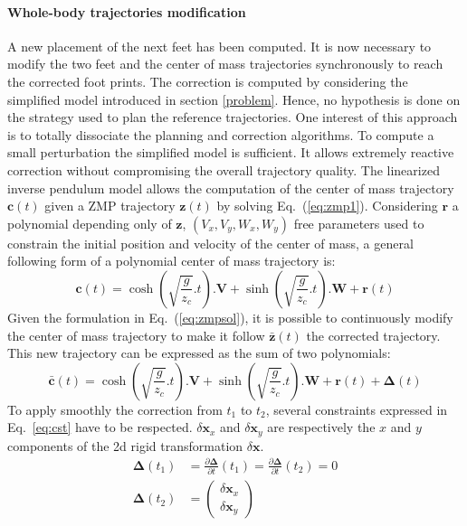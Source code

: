 \paragraph{Whole-body trajectories modification}
%
A new placement of the next feet has been computed. It is now necessary
to modify the two feet and the center of mass trajectories
synchronously to reach the corrected foot prints.
%
The correction is computed by considering the simplified model
introduced in section \ref{problem}. Hence, no hypothesis is done on
the strategy used to plan the reference trajectories. One interest of
this approach is to totally dissociate the planning and correction
algorithms. To compute a small perturbation the simplified model is
sufficient. It allows extremely reactive correction without
compromising the overall trajectory quality.
%
%
The linearized inverse pendulum model allows the computation of the
center of mass trajectory $\mathbf{c}(t)$ given a ZMP trajectory
$\mathbf{z}(t)$ by solving Eq.~(\ref{eq:zmp1}). Considering $\mathbf{r}$ a
polynomial depending only of $\mathbf{z}$, $(V_x, V_y, W_x, W_y)$ free
parameters used to constrain the initial position and velocity of the
center of mass, a general following form of a polynomial center of
mass trajectory is:
%
\begin{equation} \label{eq:zmpsol}
  \mathbf{c}(t) = \cosh(\sqrt{\frac{g}{z_c}}.t) . \mathbf{V} + \sinh(\sqrt{\frac{g}{z_c}}.t) . \mathbf{W} + \mathbf{r}(t)
\end{equation}
%
Given the formulation in Eq.~(\ref{eq:zmpsol}), it is possible to
continuously modify the center of mass trajectory to make it follow
\mbox{$\bar{\mathbf{z}}(t)$} the corrected trajectory. This new
trajectory can be expressed as the sum of two polynomials:
%
\begin{equation} \label{eq:zmpsolcor}
  \bar{\mathbf{c}}(t) = \cosh(\sqrt{\frac{g}{z_c}}.t) . \mathbf{V} +
  \sinh(\sqrt{\frac{g}{z_c}}.t) . \mathbf{W} + \mathbf{r}(t) + \mathbf{\Delta}(t)
\end{equation}
%
To apply smoothly the correction from $t_1$ to $t_2$, several
constraints expressed in Eq.~\ref{eq:cst} have to be respected.
$\delta \mathbf{x}_x$ and $\delta \mathbf{x}_y$ are respectively the
$x$ and $y$ components of the 2d rigid transformation $\delta
\mathbf{x}$.
%
\begin{equation}
\begin{aligned}
  \mathbf{\Delta}(t_1) &= \frac{\partial \mathbf{\Delta}}{\partial t}(t_1) = \frac{\partial
    \mathbf{\Delta}}{\partial t}(t_2) = 0\\
  \mathbf{\Delta}(t_2) &= \left(
  \begin{array}{c}
    \delta \mathbf{x}_x \\
    \delta \mathbf{x}_y
  \end{array}
  \right)
\end{aligned}
\label{eq:cst}
\end{equation}
